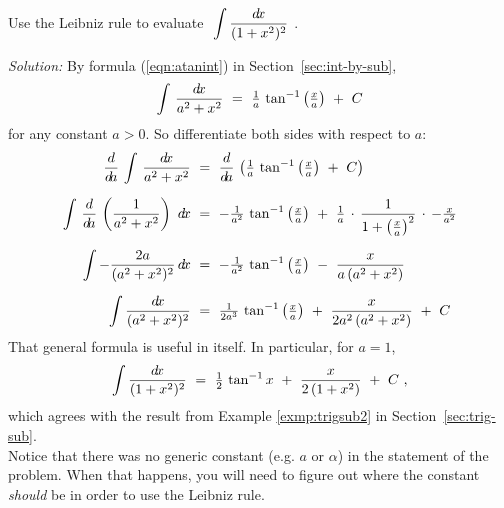 \begin{exmp}\label{exmp:intleibniz1}
\noindent Use the Leibniz rule to evaluate
$~\displaystyle\int \frac{d\!x}{(1 + x^2)^2}~$.\vspace{1mm}
\par\noindent\emph{Solution:} By formula (\ref{eqn:atanint}) in Section~\ref{sec:int-by-sub},
\[
\int\,\frac{d\!x}{a^2 + x^2} ~=~ \tfrac{1}{a}\,\tan^{-1}\left(\tfrac{x}{a}\right) ~+~ C
\]
for any constant $a > 0$. So differentiate both sides with respect to $a$:
\begin{align*}
\frac{d}{d\!a}\,\int\,\frac{d\!x}{a^2 + x^2} ~&=~
 \frac{d}{d\!a}\,\left(\tfrac{1}{a}\,\tan^{-1}\left(\tfrac{x}{a}\right) ~+~ C\right)\\[6pt]
\int\,\frac{d}{d\!a}\,\left(\frac{1}{a^2 + x^2}\right)~d\!x ~&=~
-\tfrac{1}{a^2}\,\tan^{-1}\left(\tfrac{x}{a}\right) ~+~
\tfrac{1}{a}\,\cdot\,\frac{1}{1 + \left(\tfrac{x}{a}\right)^2}\,\cdot\,-\tfrac{x}{a^2}\\[6pt]
\int -\frac{2a}{(a^2 + x^2)^2}\,d\!x ~&=~ -\tfrac{1}{a^2}\,\tan^{-1}\left(\tfrac{x}{a}\right) ~-~
 \frac{x}{a\,(a^2 + x^2)}\\[6pt]
\int \frac{d\!x}{(a^2 + x^2)^2} ~&=~ \tfrac{1}{2a^3}\,\tan^{-1}\left(\tfrac{x}{a}\right) ~+~
\frac{x}{2a^2\,(a^2 + x^2)} ~+~ C
\end{align*}
That general formula is useful in itself. In particular, for $a=1$,
\[
\int \frac{d\!x}{(1 + x^2)^2} ~=~ \tfrac{1}{2}\,\tan^{-1} x ~+~ \frac{x}{2\,(1 + x^2)} ~+~ C ~,
\]
which agrees with the result from Example \ref{exmp:trigsub2} in Section~\ref{sec:trig-sub}.\\
Notice that there was no generic constant (e.g. $a$ or $\alpha$) in the
statement of the problem. When that happens, you will need to figure out where
the constant \emph{should} be in order to use the Leibniz rule.
\end{exmp}
\divider
\vspace{2mm}

